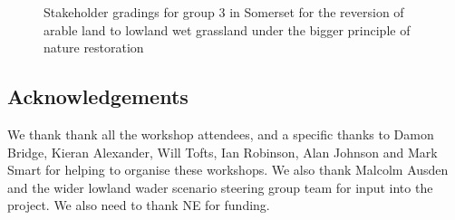 \documentclass[
  12pt,
  letterpaper,
  DIV=11,
  numbers=noendperiod]{scrartcl}
\begin{document}
\begin{figure}[H]


\caption{\label{fig-SomArMoreG3}Stakeholder gradings for group 3 in
Somerset for the reversion of arable land to lowland wet grassland under
the bigger principle of nature restoration}

\end{figure}%

\newpage{}

\subsection{Acknowledgements}\label{acknowledgements}

We thank thank all the workshop attendees, and a specific thanks to
Damon Bridge, Kieran Alexander, Will Tofts, Ian Robinson, Alan Johnson
and Mark Smart for helping to organise these workshops. We also thank
Malcolm Ausden and the wider lowland wader scenario steering group team
for input into the project. We also need to thank NE for funding.

\newpage{}
\end{document}
